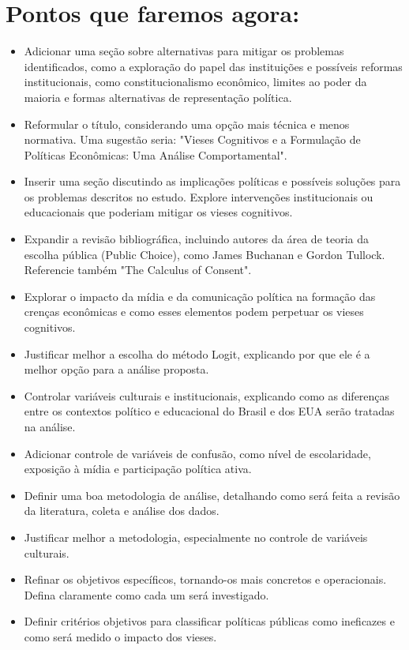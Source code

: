 \documentclass[
	article,
	12pt,
	oneside,
	a4paper,
	english,
	brazil,
	sumario=tradicional
]{abntex2}
\begin{document}
\chapter{Pontos que faremos agora:}
\begin{itemize}
  \item Adicionar uma seção sobre alternativas para mitigar os problemas identificados, como a exploração do papel das instituições e possíveis reformas institucionais, como constitucionalismo econômico, limites ao poder da maioria e formas alternativas de representação política.
  \item Reformular o título, considerando uma opção mais técnica e menos normativa. Uma sugestão seria: "Vieses Cognitivos e a Formulação de Políticas Econômicas: Uma Análise Comportamental".
  \item Inserir uma seção discutindo as implicações políticas e possíveis soluções para os problemas descritos no estudo. Explore intervenções institucionais ou educacionais que poderiam mitigar os vieses cognitivos.
  \item Expandir a revisão bibliográfica, incluindo autores da área de teoria da escolha pública (Public Choice), como James Buchanan e Gordon Tullock. Referencie também "The Calculus of Consent".
  \item Explorar o impacto da mídia e da comunicação política na formação das crenças econômicas e como esses elementos podem perpetuar os vieses cognitivos.
  \item Justificar melhor a escolha do método Logit, explicando por que ele é a melhor opção para a análise proposta.
  \item Controlar variáveis culturais e institucionais, explicando como as diferenças entre os contextos político e educacional do Brasil e dos EUA serão tratadas na análise.
  \item Adicionar controle de variáveis de confusão, como nível de escolaridade, exposição à mídia e participação política ativa.
  \item Definir uma boa metodologia de análise, detalhando como será feita a revisão da literatura, coleta e análise dos dados.
  \item Justificar melhor a metodologia, especialmente no controle de variáveis culturais.
  \item Refinar os objetivos específicos, tornando-os mais concretos e operacionais. Defina claramente como cada um será investigado.
  \item Definir critérios objetivos para classificar políticas públicas como ineficazes e como será medido o impacto dos vieses.

\end{itemize}
\end{document}
